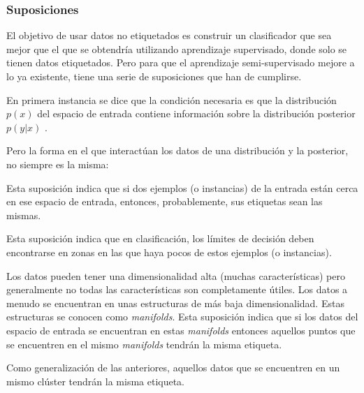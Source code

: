 \subsubsection{Suposiciones}
El objetivo de usar datos no etiquetados es construir un clasificador que sea
mejor que el que se obtendría utilizando aprendizaje supervisado, donde solo se
tienen datos etiquetados. Pero para que el aprendizaje semi-supervisado mejore a
lo ya existente, tiene una serie de suposiciones que han de cumplirse.

En primera instancia se dice que la condición necesaria es que la distribución
$p(x)$ del espacio de entrada contiene información sobre la distribución
posterior $p(y|x)$ \cite{vanEngelen2020}.

Pero la forma en el que interactúan los datos de una distribución y la posterior,
no siempre es la misma:

\begin{tcolorbox}[colback=cyan!5!white,colframe=cyan!75!black,title=\textit{Smoothness assumption}]
    Esta suposición indica que si dos ejemplos (o instancias) de la entrada
    están cerca en ese espacio de entrada, entonces, probablemente, sus
    etiquetas sean las mismas.
\end{tcolorbox}

\begin{tcolorbox}[colback=cyan!5!white,colframe=cyan!75!black,title=\textit{Low-density assumption}]
    Esta suposición indica que en clasificación, los límites de decisión deben
    encontrarse en zonas en las que haya pocos de estos ejemplos (o instancias).
\end{tcolorbox}

\begin{tcolorbox}[colback=cyan!5!white,colframe=cyan!75!black,title=\textit{Manifold assumption}]
    Los datos pueden tener una dimensionalidad alta (muchas características)
    pero generalmente no todas las características son completamente útiles. Los
    datos a menudo se encuentran en unas estructuras de más baja
    dimensionalidad. Estas estructuras se conocen como \emph{manifolds}.
    Esta suposición indica que si los datos del espacio de entrada se encuentran
    en estas \emph{manifolds} entonces aquellos puntos que se encuentren en
    el mismo \emph{manifolds} tendrán la misma etiqueta.
    \cite{towardsdatascience:semi,vanEngelen2020}
\end{tcolorbox}

\begin{tcolorbox}[colback=cyan!5!white,colframe=cyan!75!black,title=\textit{Cluster assumption}]
    Como generalización de las anteriores, aquellos datos que se encuentren en
    un mismo clúster tendrán la misma etiqueta.
\end{tcolorbox}


